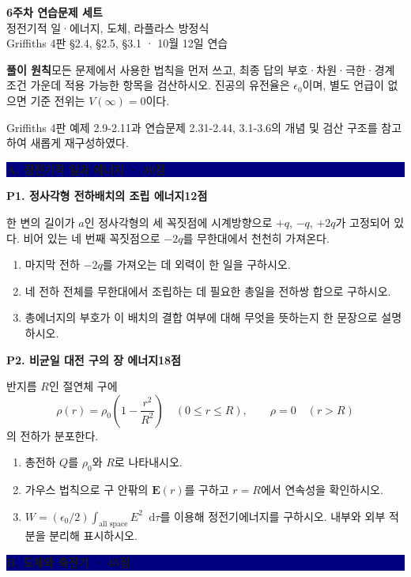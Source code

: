\documentclass[11pt,a4paper]{article}
\newcommand{\vect}[1]{\symbf{#1}}
\newcommand{\dd}{\mathop{}\!\mathrm{d}}
\newcommand{\problem}[3]{%
  \par\vspace{3.5mm}
  {\large\bfseries\color{navy}#1\hfill{\normalsize\color{blue}#2점}}\par
  \smallskip #3\par
}
\newcommand{\sectionbar}[1]{%
  \par\vspace{3mm}
  \colorbox{navy}{\parbox{0.965\linewidth}{\color{white}\bfseries\large #1}}
  \par\vspace{1mm}
}
\begin{document}
\begin{center}
  {\LARGE\bfseries\color{navy} 6주차 연습문제 세트}\\[2mm]
  {\large 정전기적 일·에너지, 도체, 라플라스 방정식}\\[1mm]
  {\small Griffiths 4판 §2.4, §2.5, §3.1 · 10월 12일 연습}
\end{center}

\begin{infobox}
\textbf{풀이 원칙}\quad 모든 문제에서 사용한 법칙을 먼저 쓰고, 최종 답의 부호·차원·극한·경계조건 가운데 적용 가능한 항목을 검산하시오. 진공의 유전율은 $\epsilon_0$이며, 별도 언급이 없으면 기준 전위는 $V(\infty)=0$이다.
\par\smallskip
{\small\color{gray}Griffiths 4판 예제 2.9-2.11과 연습문제 2.31-2.44, 3.1-3.6의 개념 및 검산 구조를 참고하여 새롭게 재구성하였다.}
\end{infobox}

\sectionbar{A. 정전기적 일과 에너지 · 30점}

\problem{P1. 정사각형 전하배치의 조립 에너지}{12}{%
한 변의 길이가 $a$인 정사각형의 세 꼭짓점에 시계방향으로 $+q$, $-q$, $+2q$가 고정되어 있다. 비어 있는 네 번째 꼭짓점으로 $-2q$를 무한대에서 천천히 가져온다.
\begin{enumerate}[label=(\alph*)]
  \item 마지막 전하 $-2q$를 가져오는 데 외력이 한 일을 구하시오.
  \item 네 전하 전체를 무한대에서 조립하는 데 필요한 총일을 전하쌍 합으로 구하시오.
  \item 총에너지의 부호가 이 배치의 결합 여부에 대해 무엇을 뜻하는지 한 문장으로 설명하시오.
\end{enumerate}
}

\problem{P2. 비균일 대전 구의 장 에너지}{18}{%
반지름 $R$인 절연체 구에
\[
  \rho(r)=\rho_0\!\left(1-\frac{r^2}{R^2}\right) \quad (0\le r\le R),
  \qquad \rho=0 \quad (r>R)
\]
의 전하가 분포한다.
\begin{enumerate}[label=(\alph*)]
  \item 총전하 $Q$를 $\rho_0$와 $R$로 나타내시오.
  \item 가우스 법칙으로 구 안팎의 $\vect E(r)$를 구하고 $r=R$에서 연속성을 확인하시오.
  \item $W=(\epsilon_0/2)\int_{\text{all space}}E^2\dd\tau$를 이용해 정전기에너지를 구하시오. 내부와 외부 적분을 분리해 표시하시오.
\end{enumerate}
}

\sectionbar{B. 도체와 축전기 · 45점}
\end{document}
